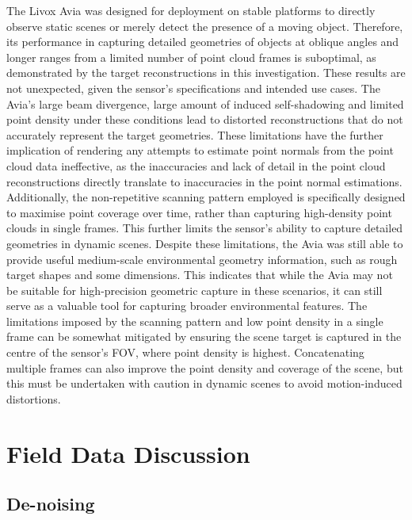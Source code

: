 The Livox Avia was designed for deployment on stable platforms to directly observe static scenes or merely detect the presence of a moving object. Therefore, its performance in capturing detailed geometries of objects at oblique angles and longer ranges from a limited number of point cloud frames is suboptimal, as demonstrated by the target reconstructions in this investigation. These results are not unexpected, given the sensor's specifications and intended use cases. The Avia's large beam divergence, large amount of induced self-shadowing and limited point density under these conditions lead to distorted reconstructions that do not accurately represent the target geometries. These limitations have the further implication of rendering any attempts to estimate point normals from the point cloud data ineffective, as the inaccuracies and lack of detail in the point cloud reconstructions directly translate to inaccuracies in the point normal estimations. Additionally, the non-repetitive scanning pattern employed is specifically designed to maximise point coverage over time, rather than capturing high-density point clouds in single frames. This further limits the sensor's ability to capture detailed geometries in dynamic scenes. Despite these limitations, the Avia was still able to provide useful medium-scale environmental geometry information, such as rough target shapes and some dimensions. This indicates that while the Avia may not be suitable for high-precision geometric capture in these scenarios, it can still serve as a valuable tool for capturing broader environmental features. The limitations imposed by the scanning pattern and low point density in a single frame can be somewhat mitigated by ensuring the scene target is captured in the centre of the sensor's \ac{FOV}, where point density is highest. Concatenating multiple frames can also improve the point density and coverage of the scene, but this must be undertaken with caution in dynamic scenes to avoid motion-induced distortions.

\section{Field Data Discussion}
\label{sec:ch8.section2}

\subsection{De-noising}
\label{subsec:ch8.section2.subsec1}

